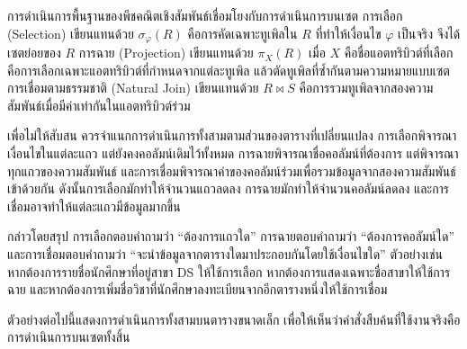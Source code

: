 การดำเนินการพื้นฐานของพีชคณิตเชิงสัมพันธ์เชื่อมโยงกับการดำเนินการบนเซต การเลือก (Selection) เขียนแทนด้วย $\sigma_{\varphi}(R)$ คือการคัดเฉพาะทูเพิลใน $R$ ที่ทำให้เงื่อนไข $\varphi$ เป็นจริง จึงได้เซตย่อยของ $R$ การฉาย (Projection) เขียนแทนด้วย $\pi_{X}(R)$ เมื่อ $X$ คือชื่อแอตทริบิวต์ที่เลือก คือการเลือกเฉพาะแอตทริบิวต์ที่กำหนดจากแต่ละทูเพิล แล้วตัดทูเพิลที่ซ้ำกันตามความหมายแบบเซต การเชื่อมตามธรรมชาติ (Natural Join) เขียนแทนด้วย $R \bowtie S$ คือการรวมทูเพิลจากสองความสัมพันธ์เมื่อมีค่าเท่ากันในแอตทริบิวต์ร่วม

เพื่อไม่ให้สับสน ควรจำแนกการดำเนินการทั้งสามตามส่วนของตารางที่เปลี่ยนแปลง การเลือกพิจารณาเงื่อนไขในแต่ละแถว แต่ยังคงคอลัมน์เดิมไว้ทั้งหมด การฉายพิจารณาชื่อคอลัมน์ที่ต้องการ แต่พิจารณาทุกแถวของความสัมพันธ์ และการเชื่อมพิจารณาค่าของคอลัมน์ร่วมเพื่อรวมข้อมูลจากสองความสัมพันธ์เข้าด้วยกัน ดังนั้นการเลือกมักทำให้จำนวนแถวลดลง การฉายมักทำให้จำนวนคอลัมน์ลดลง และการเชื่อมอาจทำให้แต่ละแถวมีข้อมูลมากขึ้น

กล่าวโดยสรุป การเลือกตอบคำถามว่า “ต้องการแถวใด” การฉายตอบคำถามว่า “ต้องการคอลัมน์ใด” และการเชื่อมตอบคำถามว่า “จะนำข้อมูลจากตารางใดมาประกอบกันโดยใช้เงื่อนไขใด” ตัวอย่างเช่น หากต้องการรายชื่อนักศึกษาที่อยู่สาขา DS ให้ใช้การเลือก หากต้องการแสดงเฉพาะชื่อสาขาให้ใช้การฉาย และหากต้องการเพิ่มชื่อวิชาที่นักศึกษาลงทะเบียนจากอีกตารางหนึ่งให้ใช้การเชื่อม

ตัวอย่างต่อไปนี้แสดงการดำเนินการทั้งสามบนตารางขนาดเล็ก เพื่อให้เห็นว่าคำสั่งสืบค้นที่ใช้งานจริงคือการดำเนินการบนเซตทั้งสิ้น

